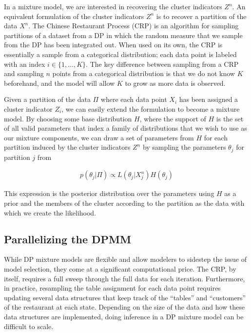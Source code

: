 In a mixture model, we are interested in recovering the cluster
indicators $Z^n$. An equivalent formulation of the cluster indicators
$Z^n$ is to recover a partition of the data $X^n$. The Chinese
Restaurant Process (CRP) is an algorithm for sampling partitions of a
dataset from a DP in which the random measure that we sample from the
DP has been integrated out. When used on its own, the CRP is
essentially a sample from a categorical distribution; each data point
is labeled with an index $i \in \{1, \ldots, K\}$. The key difference
between sampling from a CRP and sampling $n$ points from a categorical
distribution is that we do not know $K$ beforehand, and the model will
allow $K$ to grow as more data is observed.

Given a partition of the data $\Pi$ where each data point $X_i$ has
been assigned a cluster indicator $Z_i$, we can easily extend the
formulation to become a mixture model. By choosing some base
distribution $H$, where the support of $H$ is the set of all valid
parameters that index a family of distributions that we wish to use as
our mixture components, we can draw a set of parameters from $H$ for
each partition induced by the cluster indicators $Z^n$ by sampling
the parameters $\theta_j$ for partition $j$ from

\begin{align}
  p(\theta_j | \Pi) \propto L(\theta_j | X^n_j) H(\theta_j)
\end{align}

This expression is the posterior distribution over the parameters
using $H$ as a prior and the members of the cluster according to the
partition as the data with which we create the likelihood.

\subsection{Parallelizing the DPMM}

While DP mixture models are flexible and allow modelers to sidestep
the issue of model selection, they come at a significant computational
price. The CRP, by itself, requires a full sweep through the full data
for each iteration. Furthermore, in practice, resampling the table
assignment for each data point requires updating several data
structures that keep track of the ``tables'' and ``customers'' of the
restaurant at each state. Depending on the size of the data and how
these data structures are implemented, doing inference in a DP mixture
model can be difficult to scale.

